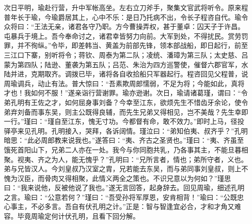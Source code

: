 次日平明，瑜赴行营，升中军帐高坐。左右立刀斧手，聚集文官武将听令。原来程普年长于瑜，今瑜爵居其上，心中不乐：是日乃托病不出，令长子程咨自代。瑜令众将曰：“王法无亲，诸君各守乃职。方今曹操弄权，甚于董卓：囚天子于许昌。屯暴兵于境上。吾今奉命讨之，诸君幸皆努力向前。大军到处，不得扰民。赏劳罚罪，并不徇纵。”令毕，即差韩当、黄盖为前部先锋，领本部战船，即日起行，前至三江口下寨，别听将令；蒋钦、周泰为第二队；凌统、潘璋为第三队；太史慈、吕蒙为第四队；陆逊、董袭为第五队；吕范、朱治为四方巡警使，催督六郡官军，水陆并进，克期取齐。调拨已毕，诸将各自收拾船只军器起行。程咨回见父程普，说周瑜调兵，动止有法。普大惊曰：“吾素欺周郎懦弱，不足为将；今能如此，真将才也！我如何不服！”遂亲诣行营谢罪。瑜亦逊谢。次日，瑜请诸葛瑾，谓曰：“令弟孔明有王佐之才，如何屈身事刘备？今幸至江东，欲烦先生不惜齿牙余论，使令弟弃刘备而事东吴，则主公既得良辅，而先生兄弟又得相见，岂不美哉？先生幸即一行。”瑾曰：“瑾自至江东，愧无寸功。今都督有命，敢不效力。”即时上马，径投驿亭来见孔明。孔明接入，哭拜，各诉阔情。瑾泣曰：“弟知伯夷、叔齐乎？”孔明暗思：“此必周郎教来说我也。”遂答曰：“夷、齐古之圣贤也。”瑾曰：“夷、齐虽至饿死首阳山下，兄弟二人亦在一处。我今与你同胞共乳，乃各事其主，不能旦暮相聚。视夷、齐之为人，能无愧乎？”孔明曰：“兄所言者，情也；弟所守者，义也。弟与兄皆汉人。今刘皇叔乃汉室之胄，兄若能去东吴，而与弟同事刘皇叔，则上不愧为汉臣，而骨肉又得相聚，此情义两全之策也。不识兄意以为何如？”瑾思曰：“我来说他，反被他说了我也。”遂无言回答，起身辞去。回见周瑜，细述孔明之言。瑜曰：“公意若何？”瑾曰：“吾受孙将军厚恩，安肯相背！”瑜曰：“公既忠心事主，不必多言。吾自有伏孔明之计。”正是：智与智逢宜必合，才和才角又难容。毕竟周瑜定何计伏孔明，且看下回分解。